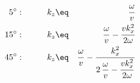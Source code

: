 \begin{eqnarray}
\label{eqn:oldtab3}
 5^\circ : \quad\quad\quad & k_z \eq &  \displaystyle {\strut\omega\over v}     \\
15^\circ : \quad\quad\quad & k_z \eq &  \displaystyle {\strut\omega\over v} -
                             \displaystyle {\strut v k_x^2\over 2\omega}
                             \nonumber \\
45^\circ : \quad\quad\quad & k_z \eq & \displaystyle{\strut \omega\over v} 
                                   -{\displaystyle {\strut k_x^2}\over
                                   \displaystyle {2\,{\omega\over v} - 
                                   {\strut v k_x^2\over 2\omega}}} 
                             \nonumber
\end{eqnarray}



